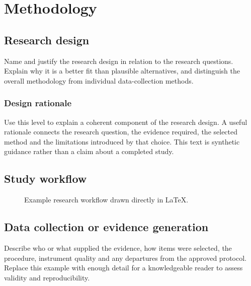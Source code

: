 \chapter{Methodology}
\label{chap:methodology}

\section{Research design}
Name and justify the research design in relation to the research questions. Explain
why it is a better fit than plausible alternatives, and distinguish the overall
methodology from individual data-collection methods.

\subsection{Design rationale}
Use this level to explain a coherent component of the research design. A useful
rationale connects the research question, the evidence required, the selected method
and the limitations introduced by that choice. This text is synthetic guidance rather
than a claim about a completed study.

\section{Study workflow}
\begin{figure}[htbp]
  \centering
  
  \caption{Example research workflow drawn directly in \LaTeX.}
  \label{fig:research-workflow}
\end{figure}


\section{Data collection or evidence generation}
Describe who or what supplied the evidence, how items were selected, the procedure,
instrument quality and any departures from the approved protocol. Replace this example
with enough detail for a knowledgeable reader to assess validity and reproducibility.

